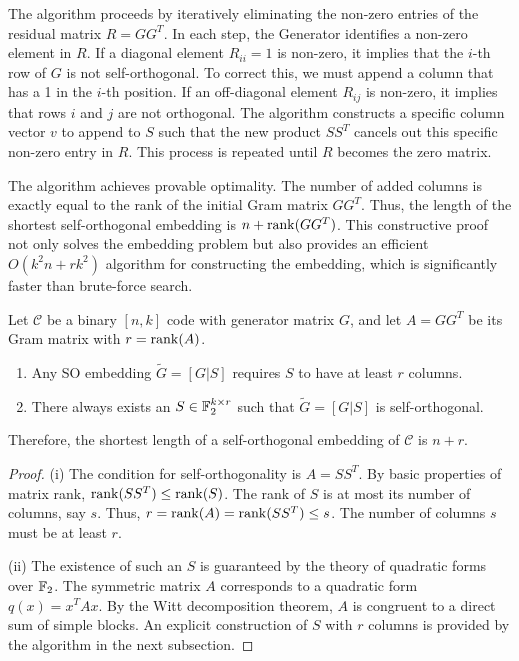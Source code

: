 The algorithm proceeds by iteratively eliminating the non-zero entries of the residual matrix $R = GG^T$. In each step, the Generator identifies a non-zero element in $R$. If a diagonal element $R_{ii} = 1$ is non-zero, it implies that the $i$-th row of $G$ is not self-orthogonal. To correct this, we must append a column that has a 1 in the $i$-th position. If an off-diagonal element $R_{ij}$ is non-zero, it implies that rows $i$ and $j$ are not orthogonal. The algorithm constructs a specific column vector $v$ to append to $S$ such that the new product $SS^T$ cancels out this specific non-zero entry in $R$. This process is repeated until $R$ becomes the zero matrix.

The algorithm achieves provable optimality. The number of added columns is exactly equal to the rank of the initial Gram matrix $GG^T$. Thus, the length of the shortest self-orthogonal embedding is $n + \mathrm{rank}(GG^T)$. This constructive proof not only solves the embedding problem but also provides an efficient $O(k^2n + rk^2)$ algorithm for constructing the embedding, which is significantly faster than brute-force search.

\begin{theorem}
Let $\mathcal{C}$ be a binary $[n, k]$ code with generator matrix $G$, and let $A = GG^T$ be its Gram matrix with $r = \mathrm{rank}(A)$.
\begin{enumerate}
    \item[(i)] Any SO embedding $\widetilde{G} = [G|S]$ requires $S$ to have at least $r$ columns.
    \item[(ii)] There always exists an $S \in \mathbb{F}_2^{k \times r}$ such that $\widetilde{G} = [G|S]$ is self-orthogonal.
\end{enumerate}
Therefore, the shortest length of a self-orthogonal embedding of $\mathcal{C}$ is $n+r$.
\end{theorem}

\begin{proof}
(i) The condition for self-orthogonality is $A = SS^T$. By basic properties of matrix rank, $\mathrm{rank}(SS^T) \le \mathrm{rank}(S)$. The rank of $S$ is at most its number of columns, say $s$. Thus, $r = \mathrm{rank}(A) = \mathrm{rank}(SS^T) \le s$. The number of columns $s$ must be at least $r$.

(ii) The existence of such an $S$ is guaranteed by the theory of quadratic forms over $\mathbb{F}_2$. The symmetric matrix $A$ corresponds to a quadratic form $q(x) = x^T A x$. By the Witt decomposition theorem, $A$ is congruent to a direct sum of simple blocks. An explicit construction of $S$ with $r$ columns is provided by the algorithm in the next subsection.
\end{proof}

